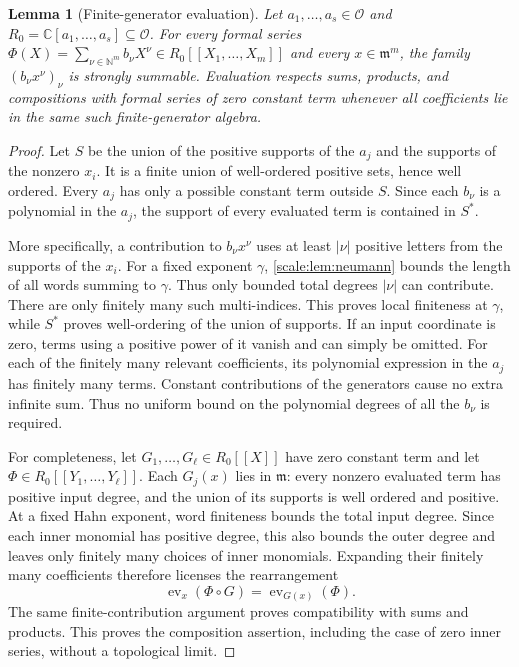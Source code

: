 \documentclass[11pt,a4paper]{article}
\numberwithin{equation}{section}
\newtheorem{lemma}[theorem]{Lemma}
\theoremstyle{definition}
\newcommand{\C}{\mathbb C}
\newcommand{\N}{\mathbb N}
\newcommand{\OO}{\mathcal O}
\newcommand{\mm}{\mathfrak m}
\begin{document}
\begin{lemma}[Finite-generator evaluation]\label{scale:lem:evaluation}
Let $a_1,\ldots,a_s\in\OO$ and
$R_0=\C[a_1,\ldots,a_s]\subseteq\OO$.
For every formal series
$\Phi(X)=\sum_{\nu\in\N^m}b_\nu X^\nu\in R_0[[X_1,\ldots,X_m]]$
and every $x\in\mm^m$, the family $(b_\nu x^\nu)_\nu$ is strongly
summable. Evaluation respects sums, products, and compositions with
formal series of zero constant term whenever all coefficients lie
in the same such finite-generator algebra.
\end{lemma}
\begin{proof}
Let $S$ be the union of the positive supports of the $a_j$ and the
supports of the nonzero $x_i$. It is a finite union of well-ordered
positive sets, hence well ordered. Every $a_j$ has only a possible
constant term outside $S$. Since each $b_\nu$ is a polynomial in the
$a_j$, the support of every evaluated term is contained in $S^*$.

More specifically, a contribution to $b_\nu x^\nu$ uses at least
$|\nu|$ positive letters from the supports of the $x_i$. For a fixed
exponent $\gamma$, \cref{scale:lem:neumann} bounds the length of all
words summing to $\gamma$. Thus only bounded total degrees $|\nu|$
can contribute. There are only finitely many such multi-indices.
This proves local finiteness at $\gamma$, while $S^*$ proves
well-ordering of the union of supports. If an input coordinate is zero,
terms using a positive power of it vanish and can simply be omitted.
For each of the finitely many relevant coefficients, its polynomial
expression in the $a_j$ has finitely many terms. Constant contributions
of the generators cause no extra infinite sum. Thus no uniform bound
on the polynomial degrees of all the $b_\nu$ is required.

For completeness, let $G_1,\ldots,G_\ell\in R_0[[X]]$ have zero
constant term and let $\Phi\in R_0[[Y_1,\ldots,Y_\ell]]$. Each
$G_j(x)$ lies in $\mm$: every nonzero evaluated term has positive input
degree, and the union of its supports is well ordered and positive.
At a fixed Hahn exponent, word finiteness bounds the total input degree.
Since each inner monomial has positive degree, this also bounds the outer
degree and leaves only finitely many choices of inner monomials. Expanding
their finitely many coefficients therefore licenses the rearrangement
\[
 \operatorname{ev}_x(\Phi\circ G)
   =\operatorname{ev}_{G(x)}(\Phi).
\]
The same finite-contribution argument proves compatibility with sums
and products. This proves the composition assertion, including the case
of zero inner series, without a topological limit.
\end{proof}
\end{document}
